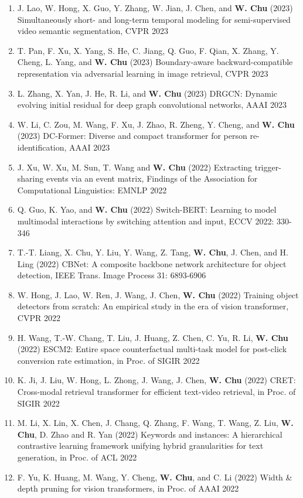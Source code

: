 \documentclass[line,10pt,final]{res}
\begin{document}
\begin{resume}
\begin{enumerate}
\item J. Lao, W. Hong, X. Guo, Y. Zhang, W. Jian, J. Chen, and {\bf W. Chu} (2023) Simultaneously short- and long-term temporal modeling for semi-supervised video semantic segmentation, CVPR 2023
\item T. Pan, F. Xu, X. Yang, S. He, C. Jiang, Q. Guo, F. Qian, X. Zhang, Y. Cheng, L. Yang, and {\bf W. Chu} (2023) Boundary-aware backward-compatible representation via adversarial learning in image retrieval, CVPR 2023
\item L. Zhang, X. Yan, J. He, R. Li, and {\bf W. Chu} (2023) DRGCN: Dynamic evolving initial residual for deep graph convolutional networks, AAAI 2023
\item W. Li, C. Zou, M. Wang, F. Xu, J. Zhao, R. Zheng, Y. Cheng, and {\bf W. Chu} (2023) DC-Former: Diverse and compact transformer for person re-identification, AAAI 2023
\item J. Xu, W. Xu, M. Sun, T. Wang and {\bf W. Chu} (2022) Extracting trigger-sharing events via an event matrix, Findings of the Association for Computational Linguistics: EMNLP 2022
\item Q. Guo, K. Yao, and {\bf W. Chu} (2022) Switch-BERT: Learning to model multimodal interactions by switching attention and input, ECCV 2022: 330-346 
\item T.-T. Liang, X. Chu, Y. Liu, Y. Wang, Z. Tang, {\bf W. Chu}, J. Chen, and H. Ling (2022) CBNet: A composite backbone network architecture for object detection, IEEE Trans. Image Process 31: 6893-6906
\item W. Hong, J. Lao, W. Ren, J. Wang, J. Chen,  {\bf W. Chu} (2022) Training object detectors from scratch: An empirical study in the era of vision transformer, CVPR 2022  
\item H. Wang, T.-W. Chang, T. Liu, J. Huang, Z. Chen, C. Yu, R. Li,  {\bf W. Chu} (2022) ESCM2: Entire space counterfactual multi-task model for post-click conversion rate estimation, in Proc. of SIGIR 2022  
\item K. Ji, J. Liu, W. Hong, L. Zhong, J. Wang, J. Chen,  {\bf W. Chu} (2022) CRET: Cross-modal retrieval transformer for efficient text-video retrieval, in Proc. of SIGIR 2022  
\item M. Li, X. Lin, X. Chen, J. Chang, Q. Zhang, F. Wang, T. Wang, Z. Liu,  {\bf W. Chu}, D. Zhao and R. Yan (2022) Keywords and instances: A hierarchical contrastive learning framework unifying hybrid granularities for text generation, in Proc. of ACL 2022  
\item F. Yu, K. Huang, M. Wang, Y. Cheng,  {\bf W. Chu}, and C. Li (2022) Width \& depth pruning for vision transformers, in Proc. of AAAI 2022  

\end{enumerate}
\end{resume}
\end{document}
